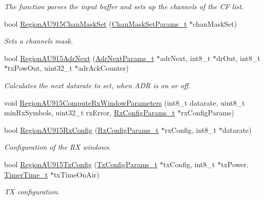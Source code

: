 \begin{DoxyCompactItemize}
\begin{DoxyCompactList}\small\item\em The function parses the input buffer and sets up the channels of the CF list. \end{DoxyCompactList}\item 
bool \hyperlink{group__REGIONAU915_gaa3219b953ef291e813856e391ec6f494}{Region\+A\+U915\+Chan\+Mask\+Set} (\hyperlink{group__REGION_ga6d24f7da136006410827dfb29f6b9b9e}{Chan\+Mask\+Set\+Params\+\_\+t} $\ast$chan\+Mask\+Set)
\begin{DoxyCompactList}\small\item\em Sets a channels mask. \end{DoxyCompactList}\item 
bool \hyperlink{group__REGIONAU915_ga1a95e39e41556d5660b62cc8e3ac375f}{Region\+A\+U915\+Adr\+Next} (\hyperlink{group__REGION_ga567c2742622326b350b4e91bbf61b4ce}{Adr\+Next\+Params\+\_\+t} $\ast$adr\+Next, int8\+\_\+t $\ast$dr\+Out, int8\+\_\+t $\ast$tx\+Pow\+Out, uint32\+\_\+t $\ast$adr\+Ack\+Counter)
\begin{DoxyCompactList}\small\item\em Calculates the next datarate to set, when A\+DR is on or off. \end{DoxyCompactList}\item 
void \hyperlink{group__REGIONAU915_ga2f0f526d4c703e4f2058990b5cf92563}{Region\+A\+U915\+Compute\+Rx\+Window\+Parameters} (int8\+\_\+t datarate, uint8\+\_\+t min\+Rx\+Symbols, uint32\+\_\+t rx\+Error, \hyperlink{group__REGION_ga375c038078dfcfc7ef14280021db719e}{Rx\+Config\+Params\+\_\+t} $\ast$rx\+Config\+Params)
\item 
bool \hyperlink{group__REGIONAU915_gaf80c46b490d80c77aa137a5abe70c073}{Region\+A\+U915\+Rx\+Config} (\hyperlink{group__REGION_ga375c038078dfcfc7ef14280021db719e}{Rx\+Config\+Params\+\_\+t} $\ast$rx\+Config, int8\+\_\+t $\ast$datarate)
\begin{DoxyCompactList}\small\item\em Configuration of the RX windows. \end{DoxyCompactList}\item 
bool \hyperlink{group__REGIONAU915_ga6016e24d99216fad47de5194957c2c01}{Region\+A\+U915\+Tx\+Config} (\hyperlink{group__REGION_gabed730d4d04b0b60d4b6d1966d3f21d3}{Tx\+Config\+Params\+\_\+t} $\ast$tx\+Config, int8\+\_\+t $\ast$tx\+Power, \hyperlink{utilities_8h_a4215ca43d3e953099ea758ce428599d0}{Timer\+Time\+\_\+t} $\ast$tx\+Time\+On\+Air)
\begin{DoxyCompactList}\small\item\em TX configuration. \end{DoxyCompactList}\item 

\end{DoxyCompactItemize}
